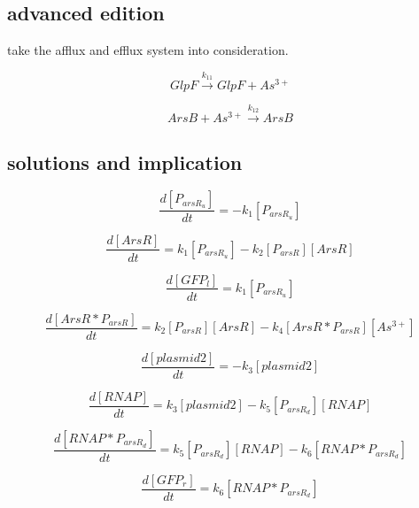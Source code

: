 \subsection {advanced edition} 
take the afflux and efflux system into consideration.

\begin{equation}
GlpF\stackrel{k_{11}}{\longrightarrow}GlpF+As^{3+}
\end{equation}

\begin{equation}
ArsB+As^{3+}\stackrel{k_{12}}{\longrightarrow}ArsB
\end{equation}



\subsection{solutions and implication}

\begin{equation}
\frac{d[P_{arsR_u}]}{dt}=-k_1[P_{arsR_u}]\tag{1}
\end{equation}

\begin{equation}
\frac{d[ArsR]}{dt}=k_1[P_{arsR_u}]-k_2[P_{arsR}][ArsR]\tag{2}
\end{equation}

\begin{equation}
\frac{d[GFP_l]}{dt}=k_1[P_{arsR_u}]\tag{3}
\end{equation}

\begin{equation}
\frac{d[ArsR*P_{arsR}]}{dt}=k_2[P_{arsR}][ArsR]-k_4[ArsR*P_{arsR} ][As^{3+}] \tag{4}
\end{equation}

\begin{equation}
\frac{d[plasmid2]}{dt}=-k_3[plasmid2]\tag{5}
\end{equation}

\begin{equation}
\frac{d[RNAP]}{dt}=k_3[plasmid2]-k_5[P_{arsR_d}][RNAP]\tag{6}
\end{equation}

\begin{equation}
\frac{d [RNAP*P_{arsR_d}]}{dt}=k_5[P_{arsR_d}][RNAP]-k_6[RNAP*P_{arsR_d}]\tag{7}
\end{equation}

\begin{equation}
\frac{d [GFP_r]}{dt}=k_6[RNAP*P_{arsR_d}]\tag{8}
\end{equation}